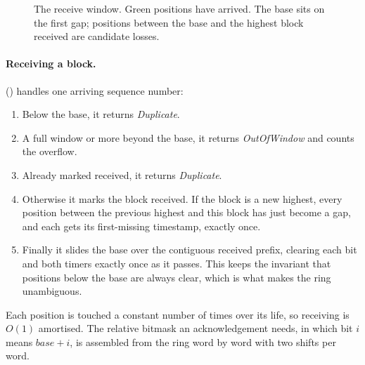 \begin{figure}[H]
\centering
{}
\caption{The receive window. Green positions have arrived. The base sits on the first gap; positions between
the base and the highest block received are candidate losses.}\label{fig:ring}
\end{figure}

\paragraph{Receiving a block.}  () handles one arriving sequence
number:
\begin{enumerate}
  \item Below the base, it returns \emph{Duplicate}.
  \item A full window or more beyond the base, it returns \emph{OutOfWindow} and counts the overflow.
  \item Already marked received, it returns \emph{Duplicate}.
  \item Otherwise it marks the block received. If the block is a new highest, every position between the
    previous highest and this block has just become a gap, and each gets its first-missing timestamp, exactly
    once.
  \item Finally it slides the base over the contiguous received prefix, clearing each bit and both timers
    exactly once as it passes. This keeps the invariant that positions below the base are always clear, which
    is what makes the ring unambiguous.
\end{enumerate}
Each position is touched a constant number of times over its life, so receiving is $O(1)$ amortised. The
relative bitmask an acknowledgement needs, in which bit $i$ means $\mathit{base}+i$, is assembled from the ring
word by word with two shifts per word.

